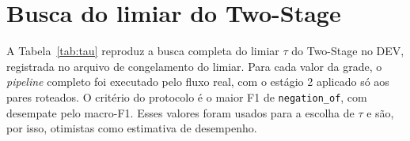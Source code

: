 \chapter[Busca do limiar do Two-Stage]{Busca do limiar do Two-Stage}
\label{ap:tau}

A Tabela~\ref{tab:tau} reproduz a busca completa do limiar $\tau$ do Two-Stage no
DEV, registrada no arquivo de congelamento do limiar. Para cada valor da grade, o
\emph{pipeline} completo foi executado pelo fluxo real, com o estágio 2 aplicado só
aos pares roteados. O critério do protocolo é o maior F1 de \texttt{negation\_of}, com
desempate pelo macro-F1. Esses valores foram usados para a escolha de $\tau$ e são,
por isso, otimistas como estimativa de desempenho.


